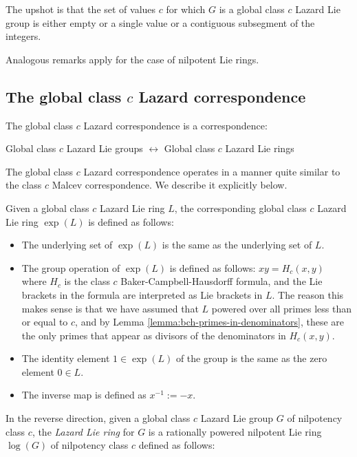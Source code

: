 \documentclass{ucetd}
\begin{document}
The upshot is that the set of values $c$ for which $G$ is a global
class $c$ Lazard Lie group is either empty or a single value or a
contiguous subsegment of the integers.

Analogous remarks apply for the case of nilpotent Lie rings.

\subsection{The global class $c$ Lazard correspondence}

The global class $c$ Lazard correspondence is a correspondence:

Global class $c$ Lazard Lie groups $\leftrightarrow$ Global class $c$
Lazard Lie rings

The global class $c$ Lazard correspondence operates in a manner quite
similar to the class $c$ Malcev correspondence. We describe it
explicitly below.

Given a global class $c$ Lazard Lie ring $L$, the corresponding global
class $c$ Lazard Lie ring $\exp(L)$ is defined as follows:

\begin{itemize}
\item The underlying set of $\exp(L)$ is the same as the underlying set of
  $L$.
\item The group operation of $\exp(L)$ is defined as follows: $xy =
  H_c(x,y)$ where $H_c$ is the class $c$ Baker-Campbell-Hausdorff
  formula, and the Lie brackets in the formula are interpreted as Lie
  brackets in $L$. The reason this makes sense is that we have assumed
  that $L$ powered over all primes less than or equal to $c$, and by
  Lemma \ref{lemma:bch-primes-in-denominators}, these are the only
  primes that appear as divisors of the denominators in $H_c(x,y)$.
\item The identity element $1 \in \exp(L)$ of the group is the same as the
  zero element $0 \in L$.
\item The inverse map is defined as $x^{-1} := -x$.
\end{itemize}

In the reverse direction, given a global class $c$ Lazard Lie group
$G$ of nilpotency class $c$, the {\em Lazard Lie ring} for $G$ is a
rationally powered nilpotent Lie ring $\log(G)$ of nilpotency class $c$
defined as follows:
\end{document}
